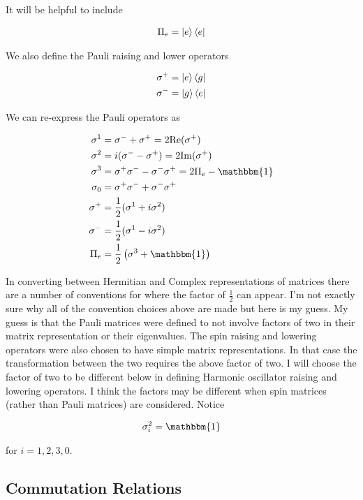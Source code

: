 \documentclass[12pt]{article}
\begin{document}
It will be helpful to include

\begin{align}
\Pi_e = \ket{e}\bra{e}
\end{align}

We also define the Pauli raising and lower operators

\begin{align}
\sigma^+ &= \ket{e}\bra{g}\\
\sigma^- &= \ket{g}\bra{e}\\
\end{align}

We can re-express the Pauli operators as

\begin{align}
\sigma^1 &= \sigma^- + \sigma^+ = 2\text{Re}(\sigma^+)\\
\sigma^2 &= i(\sigma^- - \sigma^+) = 2\text{Im}(\sigma^+)\\
\sigma^3 &= \sigma^+\sigma^- - \sigma^-\sigma^+ = 2\Pi_e - \mathbbm{1}\\
\sigma_0 &= \sigma^+\sigma^- + \sigma^-\sigma^+\\ 
\sigma^+ &= \frac{1}{2}(\sigma^1 + i \sigma^2)\\
\sigma^- &= \frac{1}{2}(\sigma^1 - i \sigma^2)\\
\Pi_e &= \frac{1}{2}\left(\sigma^3+\mathbbm{1}\right)
\end{align}

In converting between Hermitian and Complex representations of matrices there are a number of conventions for where the factor of $\frac{1}{2}$ can appear. I'm not exactly sure why all of the convention choices above are made but here is my guess. My guess is that the Pauli matrices were defined to not involve factors of two in their matrix representation or their eigenvalues. The spin raising and lowering operators were also chosen to have simple matrix representations. In that case the transformation between the two requires the above factor of two. I will choose the factor of two to be different below in defining Harmonic oscillator raising and lowering operators. I think the factors may be different when spin matrices (rather than Pauli matrices) are considered.
Notice

\begin{align}
\sigma_i^2 = \mathbbm{1}
\end{align}

for $i=1,2,3,0$.

\subsection{Commutation Relations}
\end{document}
